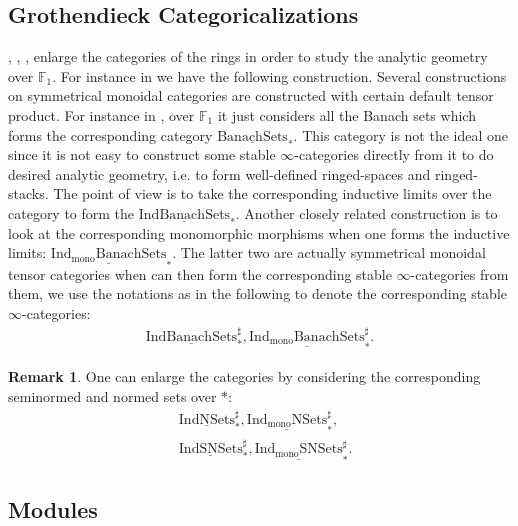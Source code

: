 \documentclass[12pt]{article}
\theoremstyle{definition}
\newtheorem{remark}{Remark}
\begin{document}
\subsection{Grothendieck Categoricalizations}

\indent \cite{BBBK}, \cite{CS1}, \cite{CS2}, \cite{CS3} enlarge the categories of the rings in order to study the analytic geometry over $\mathbb{F}_1$. For instance in \cite{BBBK} we have the following construction. Several constructions on symmetrical monoidal categories are constructed with certain default tensor product. For instance in \cite{BBBK}, over $\mathbb{F}_1$ it just considers all the Banach sets which forms the corresponding category $\underline{\mathrm{BanachSets}}_*$. This category is not the ideal one since it is not easy to construct some stable $\infty$-categories directly from it to do desired analytic geometry, i.e. to form well-defined ringed-spaces and ringed-stacks. The point of view is to take the corresponding inductive limits over the category to form the $\underline{\mathrm{IndBanachSets}}_*$. Another closely related construction is to look at the corresponding monomorphic morphisms when one forms the inductive limits: $\underline{\mathrm{Ind_{\mathrm{mono}}BanachSets}}_*$. The latter two are actually symmetrical monoidal tensor categories when can then form the corresponding stable $\infty$-categories from them, we use the notations as in the following to denote the corresponding stable $\infty$-categories:
\begin{align}
\underline{\mathrm{IndBanachSets}}^\sharp_*, \underline{\mathrm{Ind_{\mathrm{mono}}BanachSets}}^\sharp_*.
\end{align}

\begin{remark}
One can enlarge the categories by considering the corresponding seminormed and normed sets over $*$:
\begin{align}
&\underline{\mathrm{IndNSets}}^\sharp_*, \underline{\mathrm{Ind_{\mathrm{mono}}NSets}}^\sharp_*,\\
&\underline{\mathrm{IndSNSets}}^\sharp_*, \underline{\mathrm{Ind_{\mathrm{mono}}SNSets}}^\sharp_*.
\end{align}
\end{remark}


\subsection{Modules}
\end{document}
